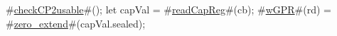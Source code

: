 #\hyperref[sailMIPSzcheckCP2usable]{checkCP2usable}#();
let capVal = #\hyperref[sailMIPSzreadCapReg]{readCapReg}#(cb);
#\hyperref[sailMIPSzwGPR]{wGPR}#(rd) = #\hyperref[sailMIPSzzzerozyextend]{zero\_extend}#(capVal.sealed);
